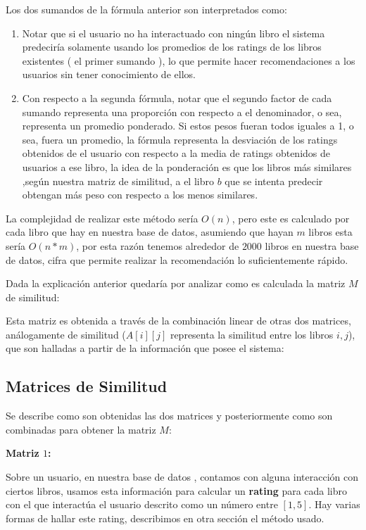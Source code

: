\documentclass[14pt]{extarticle}
\begin{document}
Los dos sumandos de la fórmula anterior son interpretados como:

\begin{enumerate}
    \item Notar que si el usuario no ha interactuado con ningún libro el sistema predeciría solamente usando los promedios de los ratings de los libros existentes ( el primer sumando ), lo que permite hacer recomendaciones a los usuarios sin tener conocimiento de ellos.
    \item Con respecto a la segunda fórmula, notar que el segundo factor de cada sumando representa una proporción con respecto a el denominador, o sea, representa un promedio ponderado. Si estos pesos fueran todos iguales a 1, o sea, fuera un promedio, la fórmula representa la desviación de los ratings obtenidos de el usuario con respecto a la media de ratings obtenidos de usuarios a ese libro, la idea de la ponderación es que los libros más similares ,según nuestra matriz de similitud, a el libro $b$ que se intenta predecir obtengan más peso con respecto a los menos similares. 
\end{enumerate}

La complejidad de realizar este método sería $O(n)$, pero este es calculado por cada libro que hay en nuestra base de datos, asumiendo que hayan $m$ libros esta sería $O(n * m)$, por esta razón tenemos alrededor de $2000$ libros en nuestra base de datos, cifra que permite realizar la recomendación lo suficientemente rápido.

Dada la explicación anterior quedaría por analizar como es calculada la matriz $M$ de similitud:

Esta matriz es obtenida a través de la combinación linear de otras dos matrices, análogamente de similitud ($A[i][j]$ representa la similitud entre los libros $i, j$), que son halladas a partir de la información que posee el sistema:

\subsection{Matrices de Similitud}

Se describe como son obtenidas las dos matrices y posteriormente como son combinadas para obtener la matriz $M$:

\textbf{Matriz $1$:}

Sobre un usuario, en nuestra base de datos , contamos con alguna interacción con ciertos libros, usamos esta información para calcular un \textbf{rating} para cada libro con el que interactúa el usuario descrito como un número entre $[1,5]$. Hay varias formas de hallar este rating, describimos en otra sección el método usado. 
\end{document}
